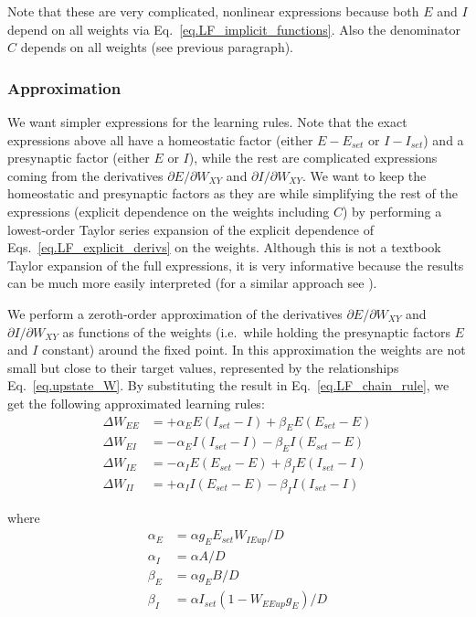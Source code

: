 \documentclass[twocolumn]{article}
\newcommand{\EE}{\mathit{EE}}
\newcommand{\EI}{\mathit{EI}}
\newcommand{\IE}{\mathit{IE}}
\newcommand{\II}{\mathit{II}}
\newcommand{\XY}{\mathit{XY}}
\newcommand{\set}{\mathit{set}}
\newcommand{\up}{\mathit{up}}
\begin{document}
\noindent Note that these are very complicated, nonlinear expressions because both $E$ and $I$ depend on all weights via Eq.\ \ref{eq.LF_implicit_functions}. Also the denominator $C$ depends on all weights (see previous paragraph).


\subsubsection{Approximation}

We want simpler expressions for the learning rules. Note that the exact expressions above all have a homeostatic factor (either $E - E_{\set}$ or $I - I_{\set}$) and a presynaptic factor (either $E$ or $I$), while the rest are complicated expressions coming from the derivatives $\partial E/\partial W_{\XY}$ and  $\partial I/\partial W_{\XY}$. We want to keep the homeostatic and presynaptic factors as they are while simplifying the rest of the expressions (explicit dependence on the weights including $C$) by performing a lowest-order Taylor series expansion of the explicit dependence of Eqs.\ \ref{eq.LF_explicit_derivs} on the weights. Although this is not a textbook Taylor expansion of the full expressions, it is very informative because the results can be much more easily interpreted (for a similar approach see \cite{Mackwood2020}).

We perform a zeroth-order approximation of the derivatives $\partial E/\partial W_{\XY}$ and  $\partial I/\partial W_{\XY}$ as functions of the weights (i.e.\ while holding the presynaptic factors $E$ and $I$ constant) around the fixed point. In this approximation the weights are not small but close to their target values, represented by the relationships Eq.\ \ref{eq.upstate_W}. By substituting the result in Eq.\ \ref{eq.LF_chain_rule}, we get the following approximated learning rules:
\begin{equation}
\begin{aligned}
\Delta W_{\EE} & = + \alpha_E E(I_{\set} - I) + \beta_E E(E_{\set} - E) \\
\Delta W_{\EI} & = - \alpha_E I(I_{\set} - I) - \beta_E I(E_{\set} - E) \\
\Delta W_{\IE} & = - \alpha_I E(E_{\set} - E) + \beta_I E(I_{\set} - I) \\
\Delta W_{\II} & = + \alpha_I I(E_{\set} - E) - \beta_I I(I_{\set} - I)
\end{aligned}
\label{eq.LF_approx}
\end{equation}

\noindent where
\begin{displaymath}
\begin{aligned}
\alpha_E & = \alpha g_E E_{\set} W_{\IE\up}/D \\
\alpha_I & = \alpha A/D \\
\beta_E & = \alpha g_E B/D \\
\beta_I & = \alpha I_{\set} (1 - W_{\EE\up} g_E)/D
\end{aligned}
\end{displaymath}
\end{document}
